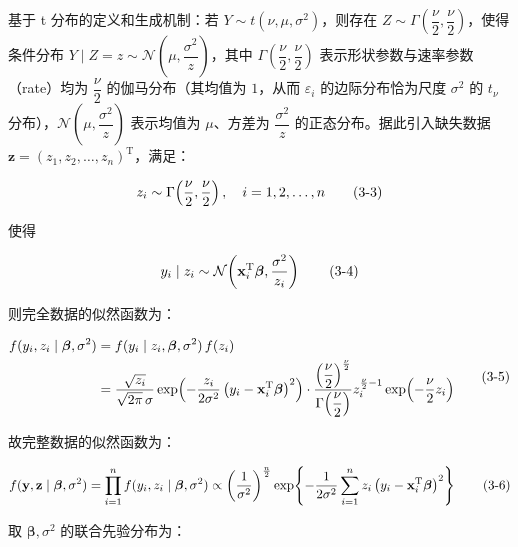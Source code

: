 \documentclass[12pt,a4paper]{ctexart}
\makeatletter
\numberwithin{figure}{section}
\numberwithin{table}{section}
\let\ltx@orig@tag\tag
\renewcommand{\tag}[1]{\refstepcounter{equation}\ltx@orig@tag{#1}}%
\makeatother
\begin{document}
基于 t 分布的定义和生成机制：若 $Y \sim t(\nu, \mu, \sigma^2)$，则存在 $Z \sim \Gamma\!\left(\dfrac{\nu}{2}, \dfrac{\nu}{2}\right)$，使得条件分布 $Y \mid Z = z \sim \mathcal{N}\!\left(\mu, \dfrac{\sigma^2}{z}\right)$，其中 $\Gamma\!\left(\dfrac{\nu}{2}, \dfrac{\nu}{2}\right)$ 表示形状参数与速率参数（rate）均为 $\dfrac{\nu}{2}$ 的伽马分布（其均值为 $1$，从而 $\varepsilon_i$ 的边际分布恰为尺度 $\sigma^2$ 的 $t_\nu$ 分布），$\mathcal{N}\!\left(\mu, \dfrac{\sigma^2}{z}\right)$ 表示均值为 $\mu$、方差为 $\dfrac{\sigma^2}{z}$ 的正态分布。据此引入缺失数据 $\mathbf{z} = (z_1, z_2, \ldots, z_n)^{\mathrm{T}}$，满足：

\begin{equation}
z_i \sim \Gamma\!\left(\frac{\nu}{2}, \frac{\nu}{2}\right), \quad i = 1, 2, \ldots, n \tag{3-3}
\end{equation}

使得

\begin{equation}
y_i \mid z_i \sim \mathcal{N}\!\left(\mathbf{x}_i^{\mathrm{T}} \boldsymbol{\beta}, \frac{\sigma^2}{z_i}\right) \tag{3-4}
\end{equation}

则完全数据的似然函数为：

\begin{equation}
\begin{aligned}
f(y_i, z_i \mid \boldsymbol{\beta}, \sigma^2) &= f(y_i \mid z_i, \boldsymbol{\beta}, \sigma^2)\, f(z_i) \\
&= \frac{\sqrt{z_i}}{\sqrt{2\pi}\,\sigma} \exp\!\left(-\frac{z_i}{2\sigma^2}\left(y_i - \mathbf{x}_i^{\mathrm{T}} \boldsymbol{\beta}\right)^2\right) \cdot \frac{\left(\dfrac{\nu}{2}\right)^{\frac{\nu}{2}}}{\Gamma\!\left(\dfrac{\nu}{2}\right)} z_i^{\frac{\nu}{2}-1} \exp\!\left(-\frac{\nu}{2} z_i\right)
\end{aligned} \tag{3-5}
\end{equation}

故完整数据的似然函数为：

\begin{equation}
f(\mathbf{y}, \mathbf{z} \mid \boldsymbol{\beta}, \sigma^2) = \prod_{i=1}^{n} f(y_i, z_i \mid \boldsymbol{\beta}, \sigma^2) \propto \left(\frac{1}{\sigma^2}\right)^{\frac{n}{2}} \exp\!\left\{-\frac{1}{2\sigma^2}\sum_{i=1}^{n} z_i\left(y_i - \mathbf{x}_i^{\mathrm{T}} \boldsymbol{\beta}\right)^2\right\} \tag{3-6}
\end{equation}

取 $\boldsymbol{\beta}, \sigma^2$ 的联合先验分布为：
\end{document}
